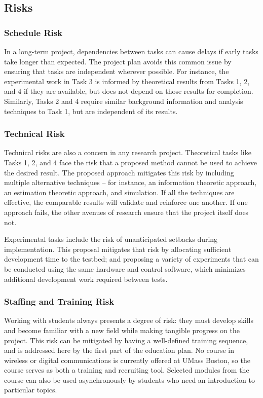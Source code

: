 \documentclass[12pt, titlepage]{article}
\begin{document}
\subsection*{Risks}
\subsubsection*{Schedule Risk}
In a long-term project, dependencies between tasks can cause delays if early tasks take longer than expected.  The project plan avoids this common issue by ensuring that tasks are independent wherever possible.  For instance, the experimental work in Task 3 is informed by theoretical results from Tasks 1, 2, and 4 if they are available, but does not depend on those results for completion.  Similarly, Tasks 2 and 4 require similar background information and analysis techniques to Task 1, but are independent of its results.  

\subsubsection*{Technical Risk}
Technical risks are also a concern in any research project.  Theoretical tasks like Tasks 1, 2, and 4 face the risk that a proposed method cannot be used to achieve the desired result.  The proposed approach mitigates this risk by including multiple alternative techniques  -- for instance, an information theoretic approach, an estimation theoretic approach, and simulation.  If all the techniques are effective, the comparable results will validate and reinforce one another.  If one approach fails, the other avenues of research ensure that the project itself does not.

Experimental tasks include the risk of unanticipated setbacks during implementation. This proposal mitigates that risk by allocating sufficient development time to the testbed; and proposing a variety of experiments that can be conducted using the same hardware and control software, which minimizes additional development work required between tests.

\subsubsection*{Staffing and Training Risk} %
Working with students always presents a degree of risk: they must develop skills and become familiar with a new field while making tangible progress on the project.  This risk can be mitigated by having a well-defined training sequence, and is addressed here by the first part of the education plan.  No course in wireless or digital communications is currently offered at UMass Boston, so the course serves as both a training and recruiting tool.  Selected modules from the course can also be used asynchronously by students who need an introduction to particular topics.
\end{document}
